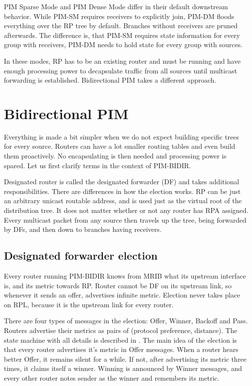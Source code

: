 PIM Sparse Mode and PIM Dense Mode differ in their default downstream behavior.
While PIM-SM requires receivers to explicitly join, PIM-DM floods everything
over the RP tree by default. Branches without receivers are pruned afterwards.
The difference is, that PIM-SM requires state information for every group with
receivers, PIM-DM needs to hold state for every group with sources.

In these modes, RP has to be an existing router and must be running and have
enough processing power to decapsulate traffic from all sources until multicast
forwarding is established. Bidirectional PIM takes a different approach.

\section{Bidirectional PIM}

Everything is made a bit simpler when we do not expect building specific trees
for every source. Routers can have a lot smaller routing tables and even build
them proactively. No encapsulating is then needed and processing power is
spared. Let us first clarify terms in the context of PIM-BIDIR.

Designated router is called the designated forwarder (DF) and takes additional
responsibilities. There are differences in how the election works. RP can be
just an arbitrary unicast routable address, and is used just as the virtual root of the
distribution tree. It does not matter whether or not any router has RPA
assigned. Every multicast packet from any source then travels up the tree,
being forwarded by DFs, and then down to branches having receivers.

\subsection{Designated forwarder election}

Every router running PIM-BIDIR knows from MRIB what its upstream interface is,
and its metric towards RP. Router cannot be DF on its upstream link, so
whenever it sends an offer, advertises infinite metric. Election never takes place
on RPL, because it is the upstream link for every router.

There are four types of messages in the election: Offer, Winner, Backoff and
Pass. Routers advertise their metrics as pairs of (protocol preference, distance).
The state machine with all details is described in . The main idea of the
election is that every router advertises it's metric in Offer messages. When
a router hears better Offer, it remains silent for a while. If not, after
advertising its metric three times, it claims itself a winner. Winning is
announced by Winner messages, and every other router notes sender as the
winner and remembers its metric.

